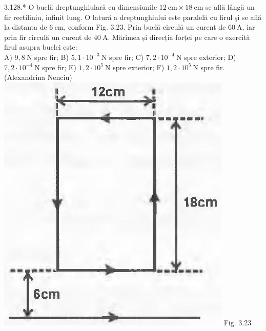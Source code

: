 \documentclass[10pt]{article}
\begin{document}
3.128.* O buclă dreptunghiulară cu dimensiunile $12 \mathrm{~cm} \times 18 \mathrm{~cm}$ se află lângă un fir rectiliniu, infinit lung. O latură a dreptunghiului este paralelă cu firul şi se află la distanta de $6 \mathrm{~cm}$, conform Fig. 3.23. Prin buclă circulă un curent de $60 \mathrm{~A}$, iar prin fir circulă un curent de $40 \mathrm{~A}$. Mărimea și direcția forței pe care o exercită firul asupra buclei este:\\ A) $9,8 \mathrm{~N}$ spre fir; B) $5,1 \cdot 10^{-3} \mathrm{~N}$ spre fir; C) $7,2 \cdot 10^{-4} \mathrm{~N}$ spre exterior; D) $7,2 \cdot 10^{-4} \mathrm{~N}$ spre fir; E) $1,2 \cdot 10^{5} \mathrm{~N}$ spre exterior; F) $1,2 \cdot 10^{5} \mathrm{~N}$ spre fir.\\ (Alexandrina Nenciu)\\ \includegraphics[max width=\textwidth, center]{2025_07_01_5b3ff9fa0d508c8e9f17g-171(1)} Fig. 3.23\\
\end{document}
